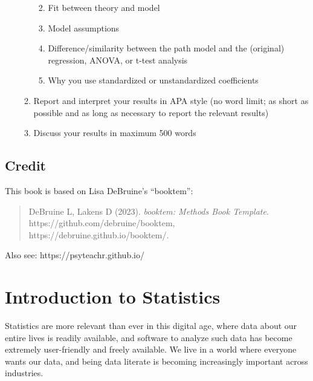 \documentclass[
  letterpaper,
]{scrbook}
\providecommand{\tightlist}{%
  \setlength{\itemsep}{0pt}\setlength{\parskip}{0pt}}\usepackage{longtable,booktabs,array}
\begin{document}
\begin{enumerate}
\begin{enumerate}
    \begin{enumerate}
    \def\labelenumiii{\roman{enumiii}.}
    \tightlist
    \item
      Fit between theory and model
    \item
      Model assumptions
    \item
      Difference/similarity between the path model and the (original)
      regression, ANOVA, or t-test analysis
    \item
      Why you use standardized or unstandardized coefficients
    \end{enumerate}
  \item
    Report and interpret your results in APA style (no word limit; as
    short as possible and as long as necessary to report the relevant
    results)
  \item
    Discuss your results in maximum 500 words
  \end{enumerate}
\end{enumerate}

\hypertarget{credit}{%
\section*{Credit}\label{credit}}


This book is based on Lisa DeBruine's ``booktem'':

\begin{quote}
DeBruine L, Lakens D (2023). \emph{booktem: Methods Book Template}.
https://github.com/debruine/booktem,
https://debruine.github.io/booktem/.
\end{quote}

Also see: https://psyteachr.github.io/


\hypertarget{sec-intro}{%
\chapter{Introduction to Statistics}\label{sec-intro}}

Statistics are more relevant than ever in this digital age, where data
about our entire lives is readily available, and software to analyze
such data has become extremely user-friendly and freely available. We
live in a world where everyone wants our data, and being data literate
is becoming increasingly important across industries.
\end{document}
